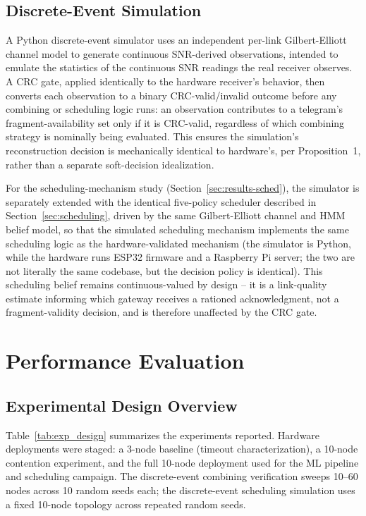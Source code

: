 \documentclass[journal]{IEEEtran}
\begin{document}
\subsection{Discrete-Event Simulation}
\label{sec:sim}
A Python discrete-event simulator uses an independent per-link Gilbert-Elliott channel model to generate continuous SNR-derived observations, intended to emulate the statistics of the continuous SNR readings the real receiver observes. A CRC gate, applied identically to the hardware receiver's behavior, then converts each observation to a binary CRC-valid/invalid outcome before any combining or scheduling logic runs: an observation contributes to a telegram's fragment-availability set only if it is CRC-valid, regardless of which combining strategy is nominally being evaluated. This ensures the simulation's reconstruction decision is mechanically identical to hardware's, per Proposition~1, rather than a separate soft-decision idealization.

For the scheduling-mechanism study (Section~\ref{sec:results-sched}), the simulator is separately extended with the identical five-policy scheduler described in Section~\ref{sec:scheduling}, driven by the same Gilbert-Elliott channel and HMM belief model, so that the simulated scheduling mechanism implements the same scheduling logic as the hardware-validated mechanism (the simulator is Python, while the hardware runs ESP32 firmware and a Raspberry Pi server; the two are not literally the same codebase, but the decision policy is identical). This scheduling belief remains continuous-valued by design -- it is a link-quality estimate informing which gateway receives a rationed acknowledgment, not a fragment-validity decision, and is therefore unaffected by the CRC gate.

\section{Performance Evaluation}

\subsection{Experimental Design Overview}
Table~\ref{tab:exp_design} summarizes the experiments reported. Hardware deployments were staged: a 3-node baseline (timeout characterization), a 10-node contention experiment, and the full 10-node deployment used for the ML pipeline and scheduling campaign. The discrete-event combining verification sweeps 10--60 nodes across 10 random seeds each; the discrete-event scheduling simulation uses a fixed 10-node topology across repeated random seeds.
\end{document}
